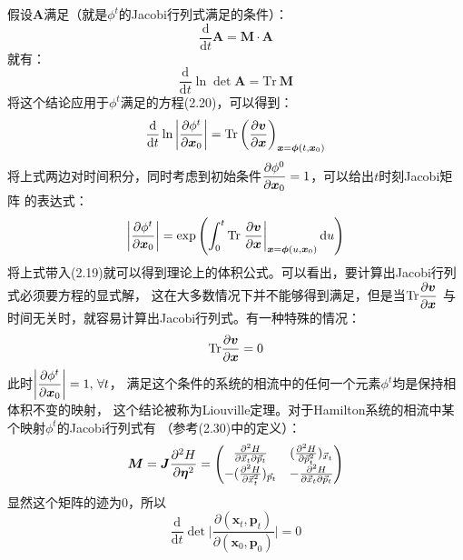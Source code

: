     假设$\bm{A}$满足（就是$\phi^t$的Jacobi行列式满足的条件）：
    \begin{equation}
        \frac {\mathrm{d}}{\mathrm{d}t} \bm{A} = \bm{M}\cdot\bm{A}
    \end{equation}
    就有：
    \begin{equation}
        \frac {\mathrm{d}}{\mathrm{d}t} \ln{\det{\bm{A}}} = \mathrm{Tr}\ \bm{M}
    \end{equation}
    将这个结论应用于$\phi^t$满足的方程(2.20)，可以得到：
    \begin{equation}
        \frac{\mathrm{d}{}}{\mathrm{d}{t}}\ln \left|\frac{\partial{\phi^t}}{\partial{\bm{x}_0}}\right| = \mathrm{Tr}\left(\frac{\partial{\bm{v}}}{\partial{\bm{x}}}\right)_{\bm{x} = \bm{\phi}(t, \bm{x}_0)}
    \end{equation}
    将上式两边对时间积分，同时考虑到初始条件$\displaystyle\frac{\partial{\phi^0}}{\partial{\bm{x}_0}} = 1$，可以给出$t$时刻Jacobi矩阵
    的表达式：
    \begin{equation}
        \left|\frac{\partial{\phi^t}}{\partial{\bm{x}_{0}}}\right| = \exp\left(\int_{0}^{t}\mathrm{Tr}\left.
        \frac{\partial{\bm{v}}}{\partial{\bm{x}}}\right|_{\bm{x} = \bm{\phi}(u, \bm{x}_0)}\mathrm{d} u\right)
    \end{equation}
    将上式带入(2.19)就可以得到理论上的体积公式。可以看出，要计算出Jacobi行列式必须要方程的显式解，
    这在大多数情况下并不能够得到满足，但是当$\displaystyle\mathrm{Tr}\frac{\partial{\bm{v}}}{\partial{\bm{x}}}$
    与时间无关时，就容易计算出Jacobi行列式。有一种特殊的情况：
    \begin{equation}
        \mathrm{Tr}\frac{\partial{\bm{v}}}{\partial{\bm{x}}} = 0
    \end{equation}
    此时$\displaystyle\left|\frac{\partial{\phi^t}}{\partial{\bm{x}_0}}\right| = 1,\, \forall t$，
    满足这个条件的系统的相流中的任何一个元素$\phi^t$均是保持相体积不变的映射，
    这个结论被称为Liouville定理。对于Hamilton系统的相流中某个映射$\phi^t$的Jacobi行列式有
    （参考(2.30)中的定义）：
    \begin{equation}
        \bm{M} = \bm{J} \frac{\partial{^2 H}}{\partial{\bm{\eta}^2}}=
        \begin{pmatrix}
        \frac {\partial^2 H}{\partial \vec{x}_t \partial \vec{p}_t} & (\frac {\partial^2 H}{\partial \vec{p}_t^2})_{\vec{x}_t}\\
        -(\frac {\partial^2 H}{\partial \vec{x}_t^2})_{\vec{p}_t} & - \frac {\partial^2 H}{\partial \vec{x}_t \partial \vec{p}_t}
        \end{pmatrix}
    \end{equation}
    显然这个矩阵的迹为0，所以
    \begin{equation}
        \frac {\mathrm{d}}{\mathrm{d}t} \det \bigg|\frac {\partial (\bm{x}_t,\bm{p}_t)}{\partial (\bm{x}_0,\bm{p}_0)} \bigg| = 0
    \end{equation}

